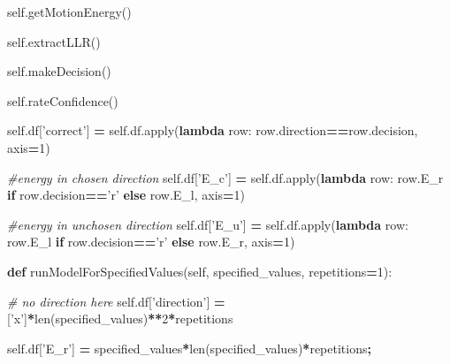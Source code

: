 \documentclass[12pt,twoside]{reedthesis}
\newenvironment{Shaded}{\begin{snugshade}}{\end{snugshade}}
\newcommand{\BuiltInTok}[1]{#1}
\newcommand{\CommentTok}[1]{\textcolor[rgb]{0.56,0.35,0.01}{\textit{#1}}}
\newcommand{\ControlFlowTok}[1]{\textcolor[rgb]{0.13,0.29,0.53}{\textbf{#1}}}
\newcommand{\DecValTok}[1]{\textcolor[rgb]{0.00,0.00,0.81}{#1}}
\newcommand{\KeywordTok}[1]{\textcolor[rgb]{0.13,0.29,0.53}{\textbf{#1}}}
\newcommand{\NormalTok}[1]{#1}
\newcommand{\OperatorTok}[1]{\textcolor[rgb]{0.81,0.36,0.00}{\textbf{#1}}}
\newcommand{\StringTok}[1]{\textcolor[rgb]{0.31,0.60,0.02}{#1}}
\newcommand{\VariableTok}[1]{\textcolor[rgb]{0.00,0.00,0.00}{#1}}
\begin{document}
\begin{Shaded}
\begin{Highlighting}[]
        \VariableTok{self}\NormalTok{.getMotionEnergy()}
        
        \VariableTok{self}\NormalTok{.extractLLR()}

        \VariableTok{self}\NormalTok{.makeDecision()}

        \VariableTok{self}\NormalTok{.rateConfidence()}
        
        \VariableTok{self}\NormalTok{.df[}\StringTok{'correct'}\NormalTok{] }\OperatorTok{=} \VariableTok{self}\NormalTok{.df.}\BuiltInTok{apply}\NormalTok{(}\KeywordTok{lambda}\NormalTok{ row: }
\NormalTok{               row.direction}\OperatorTok{==}\NormalTok{row.decision, axis}\OperatorTok{=}\DecValTok{1}\NormalTok{)}
        
        \CommentTok{#energy in chosen direction}
        \VariableTok{self}\NormalTok{.df[}\StringTok{'E_c'}\NormalTok{] }\OperatorTok{=} \VariableTok{self}\NormalTok{.df.}\BuiltInTok{apply}\NormalTok{(}\KeywordTok{lambda}\NormalTok{ row: }
\NormalTok{                                       row.E_r }\ControlFlowTok{if}\NormalTok{ row.decision}\OperatorTok{==}\StringTok{'r'} 
                                       \ControlFlowTok{else}\NormalTok{ row.E_l, axis}\OperatorTok{=}\DecValTok{1}\NormalTok{)}
        
        \CommentTok{#energy in unchosen direction}
        \VariableTok{self}\NormalTok{.df[}\StringTok{'E_u'}\NormalTok{] }\OperatorTok{=} \VariableTok{self}\NormalTok{.df.}\BuiltInTok{apply}\NormalTok{(}\KeywordTok{lambda}\NormalTok{ row: }
\NormalTok{                                       row.E_l }\ControlFlowTok{if}\NormalTok{ row.decision}\OperatorTok{==}\StringTok{'r'} 
                                       \ControlFlowTok{else}\NormalTok{ row.E_r, axis}\OperatorTok{=}\DecValTok{1}\NormalTok{)}
    
    \KeywordTok{def}\NormalTok{ runModelForSpecifiedValues(}\VariableTok{self}\NormalTok{, }
\NormalTok{          specified_values, }
\NormalTok{          repetitions}\OperatorTok{=}\DecValTok{1}\NormalTok{):}

        \CommentTok{# no direction here}
        \VariableTok{self}\NormalTok{.df[}\StringTok{'direction'}\NormalTok{] }\OperatorTok{=} 
\NormalTok{          [}\StringTok{'x'}\NormalTok{]}\OperatorTok{*}\BuiltInTok{len}\NormalTok{(specified_values)}\OperatorTok{**}\DecValTok{2}\OperatorTok{*}\NormalTok{repetitions}
        
        \VariableTok{self}\NormalTok{.df[}\StringTok{'E_r'}\NormalTok{] }\OperatorTok{=} 
\NormalTok{          specified_values}\OperatorTok{*}\BuiltInTok{len}\NormalTok{(specified_values)}\OperatorTok{*}\NormalTok{repetitions}\OperatorTok{;}
        

\end{Highlighting}
\end{Shaded}
\end{document}
